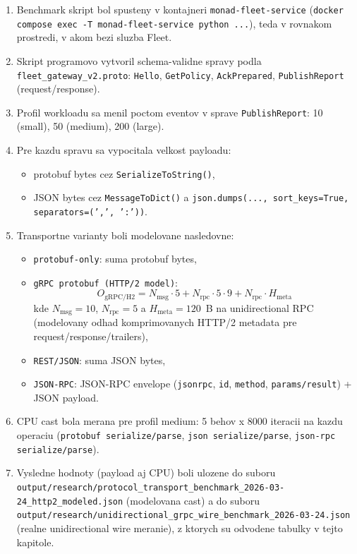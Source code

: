 \documentclass[12pt,a4paper]{report}
\begin{document}
\begin{enumerate}
  \item Benchmark skript bol spusteny v kontajneri
  \texttt{monad-fleet-service}
  (\texttt{docker compose exec -T monad-fleet-service python ...}),
  teda v rovnakom prostredi, v akom bezi sluzba Fleet.
  \item Skript programovo vytvoril schema-validne spravy podla
  \texttt{fleet\_gateway\_v2.proto}:
  \texttt{Hello}, \texttt{GetPolicy},
  \texttt{AckPrepared}, \texttt{PublishReport} (request/response).
  \item Profil workloadu sa menil poctom eventov v sprave
  \texttt{PublishReport}: 10 (small), 50 (medium), 200 (large).
  \item Pre kazdu spravu sa vypocitala velkost payloadu:
  \begin{itemize}
    \item protobuf bytes cez \texttt{SerializeToString()},
    \item JSON bytes cez \texttt{MessageToDict()} a
    \texttt{json.dumps(..., sort\_keys=True, separators=(',', ':'))}.
  \end{itemize}
  \item Transportne varianty boli modelovane nasledovne:
  \begin{itemize}
    \item \texttt{protobuf-only}: suma protobuf bytes,
    \item \texttt{gRPC protobuf (HTTP/2 model)}:
    \begin{equation}
    O_{\text{gRPC/H2}} =
    N_{\text{msg}}\cdot5 +
    N_{\text{rpc}}\cdot5\cdot9 +
    N_{\text{rpc}}\cdot H_{\text{meta}}
    \end{equation}
    kde $N_{\text{msg}}=10$, $N_{\text{rpc}}=5$ a
    $H_{\text{meta}}=120$~B na unidirectional RPC (modelovany odhad
    komprimovanych HTTP/2 metadata pre request/response/trailers),
    \item \texttt{REST/JSON}: suma JSON bytes,
    \item \texttt{JSON-RPC}: JSON-RPC envelope
    (\texttt{jsonrpc}, \texttt{id}, \texttt{method}, \texttt{params/result})
    + JSON payload.
  \end{itemize}
  \item CPU cast bola merana pre profil medium:
  5 behov x 8000 iteracii na kazdu operaciu
  (\texttt{protobuf serialize/parse}, \texttt{json serialize/parse},
  \texttt{json-rpc serialize/parse}).
  \item Vysledne hodnoty (payload aj CPU) boli ulozene do suboru
  \texttt{output/research/protocol\_transport\_benchmark\_2026-03-24\_http2\_modeled.json}
  (modelovana cast) a do suboru
  \texttt{output/research/unidirectional\_grpc\_wire\_benchmark\_2026-03-24.json}
  (realne unidirectional wire meranie), z ktorych su odvodene tabulky v tejto kapitole.
\end{enumerate}
\end{document}

